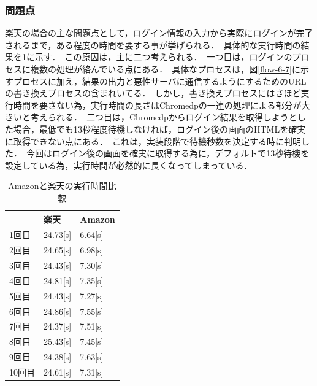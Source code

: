 \documentclass[dvipdfmx]{jsarticle}
\begin{document}
                \subsubsection{問題点}
                    楽天の場合の主な問題点として，ログイン情報の入力から実際にログインが完了されるまで，ある程度の時間を要する事が挙げられる．\
                    具体的な実行時間の結果を\ref{calc-run-time}に示す．\
                    この原因は，主に二つ考えられる．\
                    一つ目は，ログインのプロセスに複数の処理が絡んでいる点にある．\
                    具体なプロセスは，図\ref{flow-6-7}に示すプロセスに加え，結果の出力と悪性サーバに通信するようにするためのURLの書き換えプロセスの含まれいてる．\
                    しかし，書き換えプロセスにはさほど実行時間を要さない為，実行時間の長さはChromedpの一連の処理による部分が大きいと考えられる．\
                    二つ目は，Chromedpからログイン結果を取得しようとした場合，最低でも13秒程度待機しなければ，ログイン後の画面のHTMLを確実に取得できない点にある．\
                    これは，実装段階で待機秒数を決定する時に判明した．\
                    今回はログイン後の画面を確実に取得する為に，デフォルトで13秒待機を設定している為，実行時間が必然的に長くなってしまっている．\
                    \begin{table}[pth]
                        \centering
                        \caption{Amazonと楽天の実行時間比較}
                        \begin{tabular}{lll}
                        \hline
                             & 楽天           & Amazon      \\ \hline
                        1回目  & 24.73{[}s{]} & 6.64{[}s{]} \\
                        2回目  & 24.65{[}s{]} & 6.98{[}s{]} \\
                        3回目  & 24.43{[}s{]} & 7.30{[}s{]} \\
                        4回目  & 24.81{[}s{]} & 7.35{[}s{]} \\
                        5回目  & 24.43{[}s{]} & 7.27{[}s{]} \\
                        6回目  & 24.86{[}s{]} & 7.55{[}s{]} \\
                        7回目  & 24.37{[}s{]} & 7.51{[}s{]} \\
                        8回目  & 25.43{[}s{]} & 7.45{[}s{]} \\
                        9回目  & 24.38{[}s{]} & 7.63{[}s{]} \\
                        10回目 & 24.61{[}s{]} & 7.31{[}s{]} \\ \hline
                        \end{tabular}
                        \label{calc-run-time}
                    \end{table}
\end{document}
